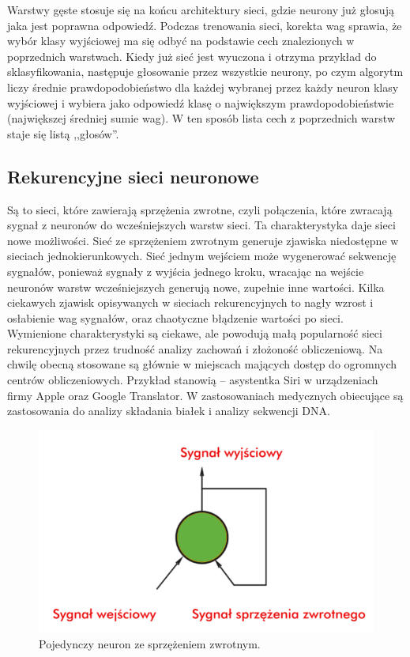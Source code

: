\documentclass[12pt,a4paper,twoside,titlepage,openright]{book}
\begin{document}
\begin{itemize}
Warstwy gęste stosuje się na końcu architektury sieci, gdzie neurony już głosują jaka jest poprawna odpowiedź. Podczas trenowania sieci, korekta wag sprawia, że wybór klasy wyjściowej ma się odbyć na podstawie cech znalezionych w poprzednich warstwach. Kiedy już sieć jest wyuczona i otrzyma przykład do sklasyfikowania, następuje głosowanie przez wszystkie neurony, po czym algorytm liczy średnie prawdopodobieństwo dla każdej wybranej przez każdy neuron klasy wyjściowej i wybiera jako odpowiedź klasę o największym prawdopodobieństwie (największej średniej sumie wag). W ten sposób lista cech z poprzednich warstw staje się listą ,,głosów''.

\subsection{Rekurencyjne sieci neuronowe}
Są to sieci, które zawierają sprzężenia zwrotne, czyli połączenia, które zwracają sygnał z neuronów do wcześniejszych warstw sieci. Ta charakterystyka daje sieci nowe możliwości. Sieć ze sprzężeniem zwrotnym generuje zjawiska niedostępne w sieciach jednokierunkowych. Sieć jednym wejściem może wygenerować sekwencję sygnałów, ponieważ sygnały z wyjścia jednego kroku, wracając na wejście neuronów warstw wcześniejszych generują nowe, zupełnie inne wartości. Kilka ciekawych zjawisk opisywanych w sieciach rekurencyjnych to nagły wzrost i osłabienie wag sygnałów, oraz chaotyczne błądzenie wartości po sieci. Wymienione charakterystyki są ciekawe, ale powodują małą popularność sieci rekurencyjnych przez trudność analizy zachowań i złożoność obliczeniową. Na chwilę obecną stosowane są głównie w miejscach mających dostęp do ogromnych centrów obliczeniowych. Przykład stanowią -- asystentka Siri w urządzeniach firmy Apple oraz Google Translator. W zastosowaniach medycznych obiecujące są zastosowania do analizy składania białek i analizy sekwencji DNA.

\begin{figure}[ht]
	\centering
			\includegraphics[resolution=100, scale=0.5]{recurrentNeuralNetwork.png}
		\caption{Pojedynczy neuron ze sprzężeniem zwrotnym.}
\end{figure}


\end{itemize}
\end{document}
